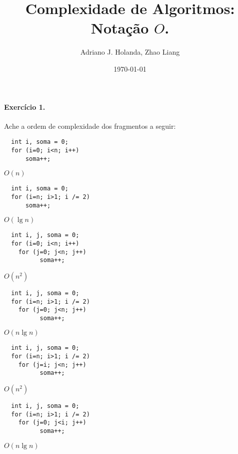 \documentclass{article}
\title{Complexidade de Algoritmos: Notação $O$.}
\author{Adriano J. Holanda, Zhao Liang}
\date{\today}
\begin{document}
\maketitle
\paragraph{Exercício 1.} Ache a ordem de complexidade dos fragmentos a
seguir:

\begin{enumerate}[a)]

\begin{minipage}{.6\textwidth}
\item
  \begin{lstlisting}
  int i, soma = 0;
  for (i=0; i<n; i++)
      soma++;
  \end{lstlisting}
  $O(n)$
\end{minipage}
\begin{minipage}{.4\textwidth}
\item
\begin{lstlisting}
  int i, soma = 0;
  for (i=n; i>1; i /= 2)
      soma++;
\end{lstlisting}
  $O(\lg n)$
\end{minipage}
\begin{minipage}{.6\textwidth}
\item
\begin{lstlisting}
  int i, j, soma = 0;
  for (i=0; i<n; i++)
    for (j=0; j<n; j++)
          soma++;
\end{lstlisting}
  $O(n^2)$
\end{minipage}
\begin{minipage}{.4\textwidth}
  \item
\begin{lstlisting}
  int i, j, soma = 0;
  for (i=n; i>1; i /= 2)
    for (j=0; j<n; j++)
          soma++;
\end{lstlisting}
  $O(n\lg n)$
\end{minipage}
\begin{minipage}{.6\textwidth}
\item
\begin{lstlisting}
  int i, j, soma = 0;
  for (i=n; i>1; i /= 2)
    for (j=i; j<n; j++)
          soma++;
\end{lstlisting}
  $O(n^2)$
\end{minipage}
\begin{minipage}{.4\textwidth}
\item
\begin{lstlisting}
  int i, j, soma = 0;
  for (i=n; i>1; i /= 2)
    for (j=0; j<i; j++)
          soma++;
\end{lstlisting}
  $O(n\lg n)$
\end{minipage}

\end{enumerate}
\end{document}
